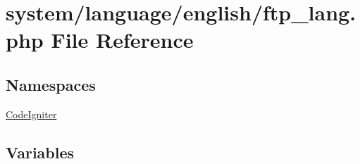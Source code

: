 \hypertarget{ftp__lang_8php}{}\section{system/language/english/ftp\+\_\+lang.php File Reference}
\label{ftp__lang_8php}
\subsection*{Namespaces}
\begin{DoxyCompactItemize}
\item 
 \mbox{\hyperlink{namespace_code_igniter}{Code\+Igniter}}
\end{DoxyCompactItemize}
\subsection*{Variables}
